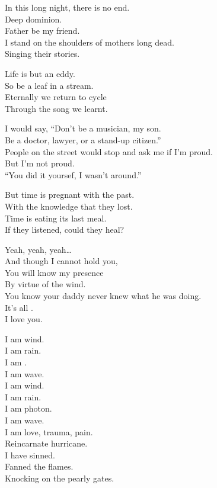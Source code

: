 
In this long night, there is no end. \\
Deep dominion. \\
Father be my friend. \\
I stand on the shoulders of mothers long dead. \\
Singing their stories. \\


Life is but an eddy. \\
So be a leaf in a stream. \\
Eternally we return to cycle \\
Through the song we learnt. \\


I would say, ``Don't be a musician, my son. \\
Be a doctor, lawyer, or a stand-up citizen.'' \\
People on the street would stop and ask me if I'm proud. \\
But I'm not proud. \\
``You did it yoursef, I wasn't around.'' \\


But time is pregnant with the past. \\
With the knowledge that they lost. \\
Time is eating its last meal. \\
If they listened, could they heal? \\


Yeah, yeah, yeah… \\
And though I cannot hold you, \\
You will know my presence \\
By virtue of the wind. \\
You know your daddy never knew what he was doing. \\
It's all . \\
I love you. \\


I am wind. \\
I am rain. \\
I am . \\
I am wave. \\
I am wind. \\
I am rain. \\
I am photon. \\
I am wave. \\
I am love, trauma, pain. \\
Reincarnate hurricane. \\
I have sinned. \\
Fanned the flames. \\
Knocking on the pearly gates. \\

